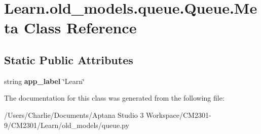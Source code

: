 \hypertarget{class_learn_1_1old__models_1_1queue_1_1_queue_1_1_meta}{\section{Learn.\-old\-\_\-models.\-queue.\-Queue.\-Meta Class Reference}
\label{class_learn_1_1old__models_1_1queue_1_1_queue_1_1_meta}
}
\subsection*{Static Public Attributes}
\begin{DoxyCompactItemize}
\item 
\hypertarget{class_learn_1_1old__models_1_1queue_1_1_queue_1_1_meta_a203ff739d7c26be78545b3be4d07a070}{string {\bfseries app\-\_\-label} \char`\"{}Learn\char`\"{}}\label{class_learn_1_1old__models_1_1queue_1_1_queue_1_1_meta_a203ff739d7c26be78545b3be4d07a070}

\end{DoxyCompactItemize}


The documentation for this class was generated from the following file\-:\begin{DoxyCompactItemize}
\item 
/\-Users/\-Charlie/\-Documents/\-Aptana Studio 3 Workspace/\-C\-M2301-\/9/\-C\-M2301/\-Learn/old\-\_\-models/queue.\-py\end{DoxyCompactItemize}
